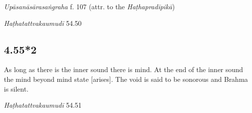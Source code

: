\begin{ekdosis}

\begin{testimonia}[hp04_055_1]
\emph{Upāsanāsārasaṅgraha} f. 107 (attr. to the \emph{Haṭhapradīpikā})
\begin{versinnote}
\end{versinnote}

\emph{Haṭhatattvakaumudī} 54.50
\begin{versinnote}
\end{versinnote}
\end{testimonia}


\subsection*{4.55*2}
\begin{translation}[hp04_055_2]
As long as there is the inner sound there is mind. At the end of the inner sound the mind beyond mind state [arises]. The void is said to be sonorous and Brahma is silent.
\end{translation}


\begin{testimonia}[hp04_055_2]
\emph{Haṭhatattvakaumudī} 54.51
\begin{versinnote}
\end{versinnote}
\end{testimonia}


\end{ekdosis}
